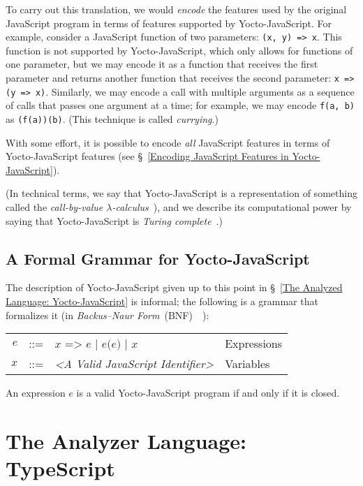 \documentclass[12pt, oneside]{book}
\begin{document}
To carry out this translation, we would \emph{encode} the features used by the original JavaScript program in terms of features supported by Yocto-JavaScript. For example, consider a JavaScript function of two parameters: \texttt{(x, y) => x}. This function is not supported by Yocto-JavaScript, which only allows for functions of one parameter, but we may encode it as a function that receives the first parameter and returns another function that receives the second parameter: \texttt{x => (y => x)}. Similarly, we may encode a call with multiple arguments as a sequence of calls that passes one argument at a time; for example, we may encode \texttt{f(a, b)} as \texttt{(f(a))(b)}. (This technique is called \emph{currying}.)

With some effort, it is possible to encode \emph{all} JavaScript features in terms of Yocto-JavaScript features (see §~\ref{Encoding JavaScript Features in Yocto-JavaScript}).

(In technical terms, we say that Yocto-JavaScript is a representation of something called the \emph{call-by-value $\lambda$-calculus}~\cite[§~6]{understanding-computation}), and we describe its computational power by saying that Yocto-JavaScript is \emph{Turing complete}~\cite[§~7]{understanding-computation}.)

\subsection{A Formal Grammar for Yocto-JavaScript}
\label{A Formal Grammar for Yocto-JavaScript}

The description of Yocto-JavaScript given up to this point in §~\ref{The Analyzed Language: Yocto-JavaScript} is informal; the following is a grammar that formalizes it (in \emph{Backus–Naur Form}~(BNF)~\cite{bnf}~\cite[§~4.2]{dragon-book}):

\begin{center}
\begin{tabular}{rcll}
$e$ & ::= & $x\texttt{ => }e$ | $e\texttt{(}e\texttt{)}$ | $x$ & Expressions \\
$x$ & ::= & \emph{<A Valid JavaScript Identifier>} & Variables \\
\end{tabular}
\end{center}

An expression $e$ is a valid Yocto-JavaScript program if and only if it is closed.

\section{The Analyzer Language: TypeScript}
\label{The Analyzer Language: TypeScript}
\end{document}
